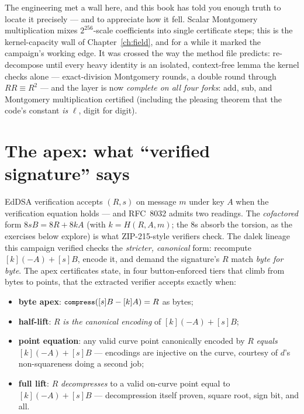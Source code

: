 The engineering met a wall here, and this book has told you enough truth
to locate it precisely --- and to appreciate how it fell. Scalar Montgomery
multiplication mixes $2^{256}$-scale coefficients into single certificate
steps; this is the kernel-capacity wall of Chapter~\ref{ch:field}, and for
a while it marked the campaign's working edge. It was crossed the way the
method file predicts: re-decompose until every heavy identity is an
isolated, context-free lemma the kernel checks alone --- exact-division
Montgomery rounds, a double round through $RR \equiv R^2$ --- and the
layer is now \emph{complete on all four forks}: add, sub, and Montgomery
multiplication certified (including the pleasing theorem that the code's
constant  \emph{is} $\ell$, digit for digit).

\section{The apex: what ``verified signature'' says}

EdDSA verification accepts $(R, s)$ on message $m$ under key $A$ when the
verification equation holds --- and RFC~8032 admits two readings. The
\emph{cofactored} form $8sB = 8R + 8kA$ (with $k = H(R,A,m)$; the $8$s
absorb the torsion, as the exercises below explore) is what ZIP-215-style
verifiers check. The dalek lineage this campaign verified checks the
\emph{stricter, canonical} form: recompute $[k](-A) + [s]B$, encode it,
and demand the signature's $R$ match \emph{byte for byte}. The apex
certificates state, in four button-enforced tiers that climb from bytes
to points, that the extracted verifier accepts exactly when:

\begin{itemize}[leftmargin=1.4em]
\item \textbf{byte apex}: $\code{compress}([s]B - [k]A) = R$ as bytes;
\item \textbf{half-lift}: $R$ \emph{is the canonical encoding} of
  $[k](-A) + [s]B$;
\item \textbf{point equation}: any valid curve point canonically encoded
  by $R$ \emph{equals} $[k](-A) + [s]B$ --- encodings are injective on
  the curve, courtesy of $d$'s non-squareness doing a second job;
\item \textbf{full lift}: $R$ \emph{decompresses} to a valid on-curve
  point equal to $[k](-A) + [s]B$ --- decompression itself proven, square
  root, sign bit, and all.
\end{itemize}

